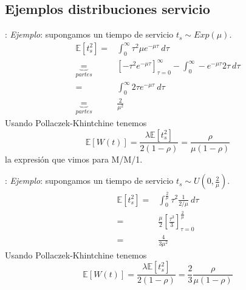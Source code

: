 \documentclass[xcolor={x11names}]{beamer}
\begin{document}
\subsection{Ejemplos distribuciones servicio}
\begin{frame}{\secname: \subsecname}
    \textit{Ejemplo}: supongamos un tiempo
    de servicio $t_s\sim Exp(\mu)$.
    \begin{align*}
        \mathbb{E}[t_s^2]
        =& \int_0^\infty
        \tau^2 \mu e^{-\mu\tau}
        \ d\tau\\
        \underbrace{=}_{partes}&
        \left[-\tau^2e^{-\mu\tau} \right]_{\tau=0}^\infty
        -\int_0^\infty -e^{-\mu\tau}2\tau\ 
        d\tau\\
        =&\int_0^\infty
        2\tau e^{-\mu\tau}\ d\tau\\
        \underbrace{=}_{partes}&
        \frac{2}{\mu^2}
    \end{align*}
    Usando Pollaczek-Khintchine tenemos
    \begin{equation*}
        \mathbb{E}[W(t)]=
        \frac{\lambda\mathbb{E}[t_s^2]}{2(1-\rho)}
        =\frac{\rho}{\mu(1-\rho)}
    \end{equation*}
    la expresión que vimos para M/M/1.
\end{frame}






\begin{frame}{\secname: \subsecname}
    \textit{Ejemplo}: supongamos un tiempo
    de servicio $t_s\sim U(0,\frac{2}{\mu})$.
    \begin{align*}
        \mathbb{E}[t_s^2]
        =& \int_0^{\tfrac{2}{\mu}}
        \tau^2 \frac{1}{2/\mu}
        \ d\tau\\
        =& \frac{\mu}{2}\left[
            \frac{\tau^3}{3}
        \right]_{\tau=0}^{\tfrac{2}{\mu}}\\
        =& \frac{4}{3\mu^2}
    \end{align*}
    Usando Pollaczek-Khintchine tenemos
    \begin{equation*}
        \mathbb{E}[W(t)]=
        \frac{\lambda\mathbb{E}[t_s^2]}{2(1-\rho)}
        =\frac{2}{3}\frac{\rho}{\mu(1-\rho)}
    \end{equation*}
\end{frame}
\end{document}
